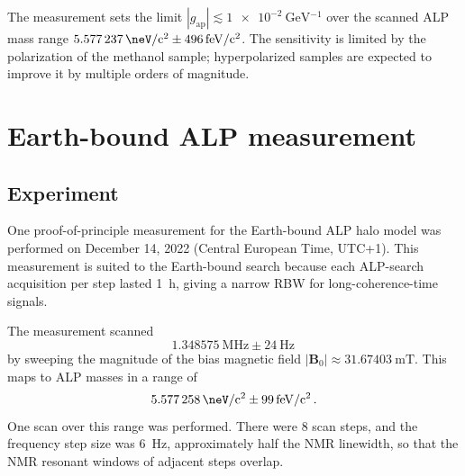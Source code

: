The measurement sets the limit $|g_\mathrm{ap}| \lesssim \SI{1e-2}{\GeV^{-1}}$ over the scanned ALP mass range $\SI{5.577237}{\neV/c^2}\pm\SI{496}{\femto\eV/c^2}$.
The sensitivity is limited by the polarization of the methanol sample; hyperpolarized samples are expected to improve it by multiple orders of magnitude.


\section{Earth-bound ALP measurement}\label{sec:results:EarthALP20221214}


\subsection{Experiment}\label{sec:results:EarthALP20221214:overview}

One proof-of-principle measurement for the Earth-bound ALP halo model was performed on December 14, 2022 (Central European Time, UTC+1).
This measurement is suited to the Earth-bound search because each ALP-search acquisition per step lasted \SI{1}{\hour}, giving a narrow RBW for long-coherence-time signals.

The measurement scanned
\begin{equation}
    \SI{1.348575}{\MHz} \pm \SI{24}{\Hz}
    \,\nonumber
\end{equation}
by sweeping the magnitude of the bias magnetic field $|\boldsymbol{B}_0| \approx \SI{31.67403}{\milli\tesla}$.
This maps to ALP masses in a range of
\begin{equation}
    \SI{5.577258}{\neV/c^2} \pm \SI{99}{\femto\electronvolt/c^2}
    \,. \nonumber
\end{equation}
One scan over this range was performed.
There were 8 scan steps, and the frequency step size was \SI{6}{\Hz}, approximately half the NMR linewidth, so that the NMR resonant windows of adjacent steps overlap.

